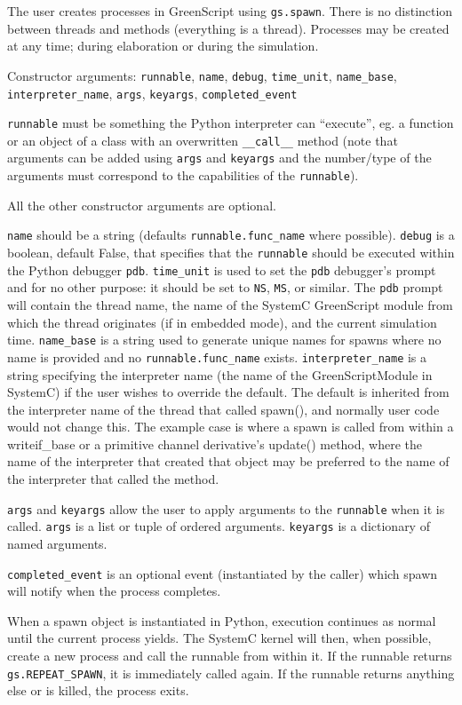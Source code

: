 \documentclass[12pt,oneside]{gsbook}
\begin{document}
 { The user creates processes in GreenScript using
\texttt{gs.spawn}.  There is no distinction between threads and
methods (everything is a thread).  Processes may be created at any
time; during elaboration or during the simulation.

Constructor arguments: \texttt{runnable}, \texttt{name},
\texttt{debug}, \texttt{time\_unit}, \texttt{name\_base},
\texttt{interpreter\_name}, \texttt{args}, \texttt{keyargs},
\texttt{completed\_event}

\texttt{runnable} must be something the Python interpreter can
``execute'', eg. a function or an object of a class
with an overwritten \texttt{\_\_call\_\_} method (note that arguments
can be added using \texttt{args} and \texttt{keyargs} and the
number/type of the arguments must correspond to the capabilities
of the \texttt{runnable}).

All the other constructor arguments are optional.

\texttt{name} should be a string (defaults \texttt{runnable.func\_name} where
possible). \texttt{debug} is a boolean, default
False, that specifies that the \texttt{runnable} should be executed
within the Python debugger \texttt{pdb}.  \texttt{time\_unit} is
used to set the \texttt{pdb} debugger's prompt and for no other purpose:
it should be set to \texttt{NS}, \texttt{MS}, or similar.  The
\texttt{pdb} prompt will contain the thread name, the name of the
SystemC GreenScript module from which the thread originates (if in
embedded mode), and the current simulation time.
\texttt{name\_base} is a string used to generate unique names for
spawns where no name is provided and no \texttt{runnable.func\_name}
exists.
\texttt{interpreter\_name} is a string specifying the interpreter
name (the name of the GreenScriptModule in SystemC) if the user
wishes to override the default.  The default is inherited from the
interpreter name of the thread that called spawn(), and normally
user code would not change this.  The example case is where a
spawn is called from within a writeif\_base or a primitive channel
derivative's update() method, where the name of the interpreter that
created that object may be preferred to the name of the interpreter
that called the method.

\texttt{args} and \texttt{keyargs} allow the user to apply arguments
to the \texttt{runnable} when it is called.  \texttt{args} is a
list or tuple of ordered arguments.  \texttt{keyargs} is a dictionary
of named arguments.

\texttt{completed\_event} is an optional event (instantiated by the
caller) which spawn will notify when the process completes.

When a spawn object is instantiated in Python, execution continues
as normal until the current process yields.  The SystemC kernel will
then, when possible, create a new process and call the runnable from
within it.  If the runnable returns \texttt{gs.REPEAT\_SPAWN}, it is
immediately called again.  If the runnable returns anything else or
is killed, the process exits.
}
\end{document}
